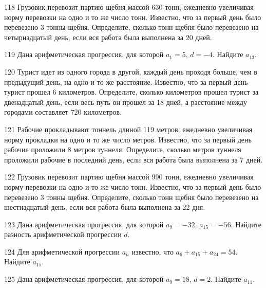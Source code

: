 \documentclass[4apaper]{article}
\begin{document}
\begin{taskBN}{118}
Грузовик перевозит партию щебня массой 630 тонн, ежедневно увеличивая норму перевозки на одно и то же число тонн. Известно, что за первый день было перевезено 3 тонны щебня. Определите, сколько тонн щебня было перевезено на четырнадцатый день, если вся работа была выполнена за 20 дней.
\end{taskBN}

\begin{taskBN}{119}
Дана арифметическая прогрессия, для которой $a_1 = 5$, $d=-4$. Найдите $a_{13}$.
\end{taskBN}

\begin{taskBN}{120}
Турист идет из одного города в другой, каждый день проходя больше, чем в предыдущий день, на одно и то же расстояние. Известно, что за первый день турист прошел 6 километров. Определите, сколько километров прошел турист за двенадцатый день, если весь путь он прошел за 18 дней, а расстояние между городами составляет 720 километров.
\end{taskBN}

\begin{taskBN}{121}
 Рабочие прокладывают тоннель длиной 119 метров, ежедневно увеличивая норму прокладки на одно и то же число метров. Известно, что за первый день рабочие проложили 8 метров туннеля.  Определите, сколько метров туннеля проложили рабочие в последний день, если вся работа была выполнена за 7 дней.
\end{taskBN}

\begin{taskBN}{122}
Грузовик перевозит партию щебня массой 990 тонн, ежедневно увеличивая норму перевозки на одно и то же число тонн. Известно, что за первый день было перевезено 3 тонны щебня. Определите, сколько тонн щебня было перевезено на шестнадцатый день, если вся работа была выполнена за 22 дня.
\end{taskBN}

\begin{taskBN}{123}
Дана арифметическая прогрессия, для которой $a_{9} = -32$, $a_{15} = -56$. Найдите разность арифметической прогрессии $d$.
\end{taskBN}

\begin{taskBN}{124}
Для арифметической прогрессии ${a_n}$ известно, что $a_{6} + a_{15} + a_{24}= 54$. Найдите $a_{15}$.
\end{taskBN}

\begin{taskBN}{125}
Дана арифметическая прогрессия, для которой $a_{9} = 18$, $d=2$. Найдите $a_{11}$.
\end{taskBN}
\end{document}
